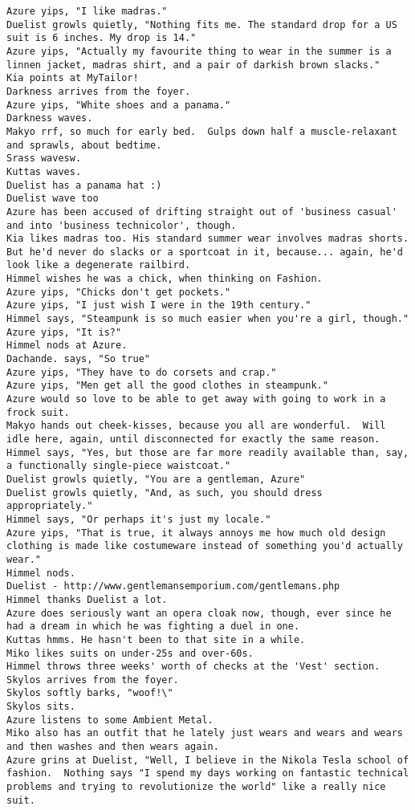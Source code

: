 \begin{verbatim}
Azure yips, "I like madras."
Duelist growls quietly, "Nothing fits me. The standard drop for a US suit is 6 inches. My drop is 14."
Azure yips, "Actually my favourite thing to wear in the summer is a linnen jacket, madras shirt, and a pair of darkish brown slacks."
Kia points at MyTailor!
Darkness arrives from the foyer.
Azure yips, "White shoes and a panama."
Darkness waves.
Makyo rrf, so much for early bed.  Gulps down half a muscle-relaxant and sprawls, about bedtime.
Srass wavesw.
Kuttas waves.
Duelist has a panama hat :)
Duelist wave too
Azure has been accused of drifting straight out of 'business casual' and into 'business technicolor', though.
Kia likes madras too. His standard summer wear involves madras shorts. But he'd never do slacks or a sportcoat in it, because... again, he'd look like a degenerate railbird.
Himmel wishes he was a chick, when thinking on Fashion.
Azure yips, "Chicks don't get pockets."
Azure yips, "I just wish I were in the 19th century."
Himmel says, "Steampunk is so much easier when you're a girl, though."
Azure yips, "It is?"
Himmel nods at Azure.
Dachande. says, "So true"
Azure yips, "They have to do corsets and crap."
Azure yips, "Men get all the good clothes in steampunk."
Azure would so love to be able to get away with going to work in a frock suit.
Makyo hands out cheek-kisses, because you all are wonderful.  Will idle here, again, until disconnected for exactly the same reason.
Himmel says, "Yes, but those are far more readily available than, say, a functionally single-piece waistcoat."
Duelist growls quietly, "You are a gentleman, Azure"
Duelist growls quietly, "And, as such, you should dress appropriately."
Himmel says, "Or perhaps it's just my locale."
Azure yips, "That is true, it always annoys me how much old design clothing is made like costumeware instead of something you'd actually wear."
Himmel nods.
Duelist - http://www.gentlemansemporium.com/gentlemans.php
Himmel thanks Duelist a lot.
Azure does seriously want an opera cloak now, though, ever since he had a dream in which he was fighting a duel in one.
Kuttas hmms. He hasn't been to that site in a while.
Miko likes suits on under-25s and over-60s.
Himmel throws three weeks' worth of checks at the 'Vest' section.
Skylos arrives from the foyer.
Skylos softly barks, "woof!\"
Skylos sits.
Azure listens to some Ambient Metal.
Miko also has an outfit that he lately just wears and wears and wears and then washes and then wears again.
Azure grins at Duelist, "Well, I believe in the Nikola Tesla school of fashion.  Nothing says "I spend my days working on fantastic technical problems and trying to revolutionize the world" like a really nice suit.

\end{verbatim}
